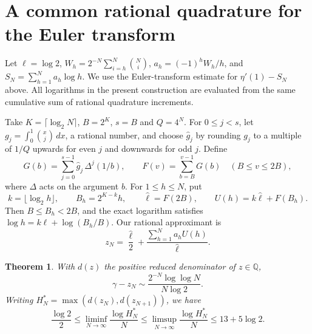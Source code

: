 \documentclass[11pt,a4paper,oneside,openany]{report}
\newtheorem{theorem}{Theorem}[section]
\theoremstyle{remark}\newtheorem{remark}[theorem]{Remark}
\numberwithin{equation}{section}
\begin{document}
\section{A common rational quadrature for the Euler transform}
\label{ch2:stcoh:section}

Let $\ell=\log2$, $W_h=2^{-N}\sum_{i=h}^N\binom Ni$,
$a_h=(-1)^hW_h/h$, and $S_N=\sum_{h=1}^Na_h\log h$. We use the
Euler-transform estimate for $\eta'(1)-S_N$ above. All logarithms in
the present construction are evaluated from the same cumulative sum
of rational quadrature increments.

Take $K=\lceil\log_2N\rceil$, $B=2^K$, $s=B$ and $Q=4^N$.
For $0\le j<s$, let $g_j=\int_0^1\binom{x}{j}\,dx$, a rational
number, and choose $\widehat g_j$ by rounding $g_j$ to a multiple of
$1/Q$ upwards for even $j$ and downwards for odd $j$. Define
\[
 G(b)=\sum_{j=0}^{s-1}\widehat g_j\,
              \Delta^j(1/b),\qquad
 F(v)=\sum_{b=B}^{v-1}G(b)\quad(B\le v\le2B),
\]
where $\Delta$ acts on the argument $b$. For $1\le h\le N$, put
\[
 k=\lfloor\log_2 h\rfloor,\qquad B_h=2^{K-k}h,\qquad
 \widehat\ell=F(2B),\qquad U(h)=k\widehat\ell+F(B_h).
\]
Then $B\le B_h<2B$, and the exact logarithm satisfies
$\log h=k\ell+\log(B_h/B)$. Our rational approximant is
\[
 z_N=\frac{\widehat\ell}{2}
       +\frac{\sum_{h=1}^N a_hU(h)}{\widehat\ell}.
\]

\begin{theorem}\label{ch2:stcoh:main}
With $d(z)$ the positive reduced denominator of $z\in\mathbb Q$,
\[
 \gamma-z_N\sim \frac{2^{-N}\log\log N}{N\log2}.
\]
Writing $H_N^*=\max(d(z_N),d(z_{N+1}))$, we have
\[
 \frac{\log2}{2}\le
 \liminf_{N\to\infty}\frac{\log H_N^*}{N}
 \le\limsup_{N\to\infty}\frac{\log H_N^*}{N}
 \le 13+5\log2.
\]
\end{theorem}
\end{document}
